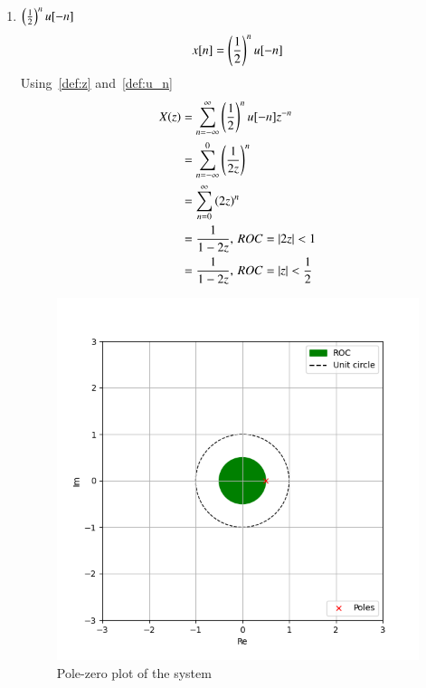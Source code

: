 \documentclass[journal,12pt,twocolumn]{IEEEtran}
\providecommand{\abs}[1]{\left\vert#1\right\vert}
\begin{document}
\begin{enumerate}[label= (\alph*)]
    \item $\left(\frac{1}{2}\right)^n u[-n]$
    \begin{align}
        x[n]=\left(\frac{1}{2}\right)^n u[-n]
    \end{align}
    Using~\eqref{def:z} and~\eqref{def:u_n}
    \begin{align}
        X(z)&=\sum_{n=-\infty}^{\infty} \brak{\frac{1}{2}}^n u[-n]z^{-n}\\
        &=\sum_{n=-\infty}^{0} \brak{\frac{1}{2z}}^n \\
        &=\sum_{n=0}^{\infty} \brak{2z}^n\\
        &=\frac{1}{1-2z},\, ROC=\abs{2z} < 1\\
        &=\frac{1}{1-2z},\, ROC=\abs{z}<\frac{1}{2}
    \end{align}
    \begin{figure}[!ht]
        \centering
        \includegraphics[width=\columnwidth]{plot/c}
        \caption{Pole-zero plot of the system}
        \label{c}
    \end{figure}
\end{enumerate}
    
\end{document}
